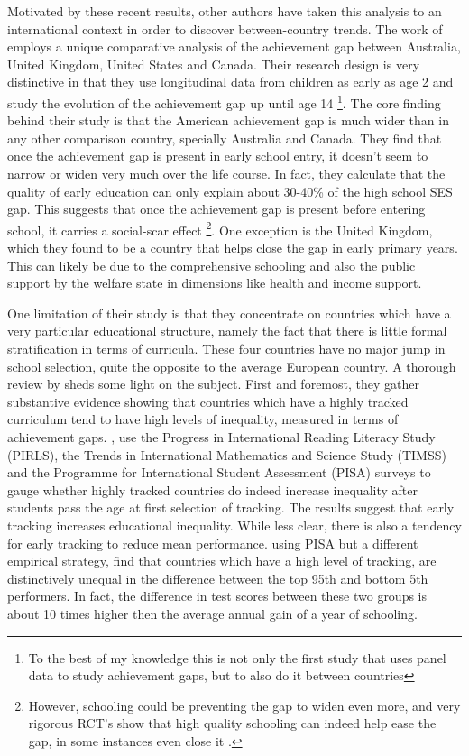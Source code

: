 \documentclass[11pt, a4paper]{article}\usepackage[]{graphicx}\usepackage[]{color}
\begin{document}
Motivated by these recent results, other authors have taken this analysis to an international context in order to discover between-country trends. The work of \citet{bradbury2015} employs a unique comparative analysis of the achievement gap between Australia, United Kingdom, United States and Canada. Their research design is very distinctive in that they use longitudinal data from children as early as age 2 and study the evolution of the achievement gap up until age 14 \footnote{To the best of my knowledge this is not only the first study that uses panel data to study achievement gaps, but to also do it between countries}. The core finding behind their study is that the American achievement gap is much wider than in any other comparison country, specially Australia and Canada. They find that once the achievement gap is present in early school entry, it doesn't seem to narrow or widen very much over the life course. In fact, they calculate that the quality of early education can only explain about  30-40\% of the high school SES gap. This suggests that once the achievement gap is present before entering school, it carries a social-scar effect \footnote{However, schooling could be preventing the gap to widen even more, and very rigorous RCT's show that high quality schooling can indeed help ease the gap, in some instances even close it \citep{campbell2002}.}. One exception is the United Kingdom, which they found to be a country that helps close the gap in early primary years. This can likely be due to the comprehensive schooling and also the public support by the welfare state in dimensions like health and income support.

One limitation of their study is that they concentrate on countries which have a very particular educational structure, namely the fact that there is little formal stratification in terms of curricula. These four countries have no major jump in school selection, quite the opposite to the average European country. A thorough review by \citet{werfhorst_mijs} sheds some light on the subject. First and foremost, they gather substantive evidence showing that countries which have a highly tracked curriculum tend to have high levels of inequality, measured in terms of achievement gaps. \citet{hanushek_woesmann_tracking}, use the Progress in International Reading Literacy Study (PIRLS), the Trends in International Mathematics and Science Study (TIMSS) and the Programme for International Student Assessment (PISA) surveys to gauge whether highly tracked countries do indeed increase inequality after students pass the age at first selection of tracking. The results suggest that early tracking increases educational inequality. While less clear, there is also a tendency for early tracking to reduce mean performance. \citet{micklewright} using PISA but a different empirical strategy, find that countries which have a high level of tracking, are distinctively unequal in the difference between the top 95th and bottom 5th performers. In fact, the difference in test scores between these two groups is about 10 times higher then the average annual gain of a year of schooling.
\end{document}
